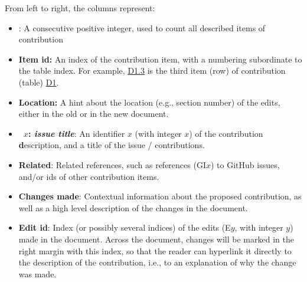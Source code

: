 From left to right, the columns represent:

\begin{itemize}

\item \bm{\#}:
	A consecutive positive integer, used to count all described items of contribution

\item \textbf{Item id:} 
	An index of the contribution item, with a numbering subordinate to the table index. 
	For example, \hyperref[it:editorial:add-abstract]{D1.3} is the third item (row) of contribution (table) \hyperref[issue:editorial-structural]{D1}.
	
\item \textbf{Location:} 
	A hint about the location (e.g., section number) of the edits, either in the old or in the new document.

\item \textbf{\colNamePropContrib\ $x$: \emph{issue title}}: 
	An identifier \textbf{$x$} (with integer $x$) of the contribution 
\textbf{d}escription, and a title of the issue / contributions.

\item \textbf{Related}: Related references, 
such as references (GI$x$) to GitHub issues, 
and/or ids of other contribution items.

\item \textbf{Changes made}: 
	Contextual information about the proposed contribution,
as well as a high level description of the changes in the document.

\item \textbf{Edit id}:
	Index (or possibly several indices) of the edits (E$y$, with integer $y$) made
in the document.
	Across the document, changes will be marked in the right margin with this index,
so that the reader can hyperlink it directly to the description of the contribution,
i.e., to an explanation of why the change was made.

\end{itemize}

\clearpage{}
{}

{
\setlength{\cftbeforeloctitleskip}{2em}
\setlength{\cftsecindent}{0em}
\setlength{\cftsecnumwidth}{0em}
}
\renewcommand\cftloctitlefont{\bfseries\LARGE}
\listofcontributions

